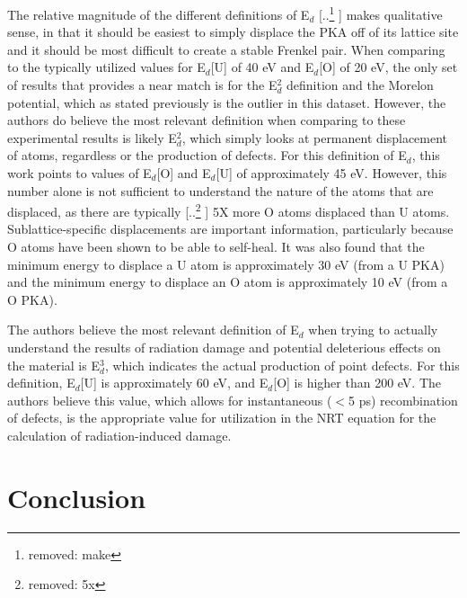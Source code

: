 \documentclass[review]{elsarticle}
\providecommand{\DIFaddtex}[1]{{\protect\color{blue} \sf #1}} %
\providecommand{\DIFdeltex}[1]{{\protect\color{red} [..\footnote{removed: #1} ]}} %
\providecommand{\DIFaddbegin}{} %
\providecommand{\DIFaddend}{} %
\providecommand{\DIFdelbegin}{} %
\providecommand{\DIFdelend}{} %
\providecommand{\DIFadd}[1]{\texorpdfstring{\DIFaddtex{#1}}{#1}} %
\providecommand{\DIFdel}[1]{\texorpdfstring{\DIFdeltex{#1}}{}} %
\newcommand{\DIFscaledelfig}{0.5}
\newlength{\DIFdelgraphicswidth} %
\newlength{\DIFdelgraphicsheight} %
\newcommand{\DIFaddincludegraphics}[2][]{{\color{blue}\fbox{\DIFOincludegraphics[#1]{#2}}}} %
\newcommand{\DIFdelincludegraphics}[2][]{%
\sbox{\DIFdelgraphicsbox}{\DIFOincludegraphics[#1]{#2}}%
\settoboxwidth{\DIFdelgraphicswidth}{\DIFdelgraphicsbox} %
\settoboxtotalheight{\DIFdelgraphicsheight}{\DIFdelgraphicsbox} %
\scalebox{\DIFscaledelfig}{%
\parbox[b]{\DIFdelgraphicswidth}{\usebox{\DIFdelgraphicsbox}\\[-\baselineskip] \rule{\DIFdelgraphicswidth}{0em}}\llap{\resizebox{\DIFdelgraphicswidth}{\DIFdelgraphicsheight}{%
\setlength{\unitlength}{\DIFdelgraphicswidth}%
\begin{picture}(1,1)%
\thicklines\linethickness{2pt} %
{\color[rgb]{1,0,0}\put(0,0){\framebox(1,1){}}}%
{\color[rgb]{1,0,0}\put(0,0){\line( 1,1){1}}}%
{\color[rgb]{1,0,0}\put(0,1){\line(1,-1){1}}}%
\end{picture}%
}\hspace*{3pt}}} %
} %
\DeclareRobustCommand{\DIFaddbegin}{\DIFOaddbegin \let\includegraphics\DIFaddincludegraphics} %
\DeclareRobustCommand{\DIFaddend}{\DIFOaddend \let\includegraphics\DIFOincludegraphics} %
\DeclareRobustCommand{\DIFdelbegin}{\DIFOdelbegin \let\includegraphics\DIFdelincludegraphics} %
\DeclareRobustCommand{\DIFdelend}{\DIFOaddend \let\includegraphics\DIFOincludegraphics} %
\begin{document}
The relative magnitude of the different definitions of E$_d$ \DIFdelbegin \DIFdel{make }\DIFdelend \DIFaddbegin \DIFadd{makes }\DIFaddend qualitative sense, in that it should be easiest to simply displace the PKA off of its lattice site and it should be most difficult to create a stable Frenkel pair. When comparing to the typically utilized values for E$_d$[U] of 40 eV and E$_d$[O] of 20 eV, the only set of results that provides a near match is for the E$_d^2$ definition and the Morelon potential, which as stated previously is the outlier in this dataset. However, the authors do believe the most relevant definition when comparing to these experimental results is likely E$_d^2$, which simply looks at permanent displacement of atoms, regardless or the production of defects. For this definition of E$_d$, this work points to values of E$_d$[O] and E$_d$[U] of approximately 45 eV. However, this number alone is not sufficient to understand the nature of the atoms that are displaced, as there are typically \DIFdelbegin \DIFdel{5x }\DIFdelend \DIFaddbegin \DIFadd{5X }\DIFaddend more O atoms displaced than U atoms. Sublattice-specific displacements are important information, particularly because O atoms have been shown to be able to self-heal. It was also found that the minimum energy to displace a U atom is approximately 30 eV (from a U PKA) and the minimum energy to displace an O atom is approximately 10 eV (from a O PKA).

The authors believe the most relevant definition of E$_d$ when trying to actually understand the results of radiation damage and potential deleterious effects on the material is E$_d^3$, which indicates the actual production of point defects. For this definition, E$_d$[U] is approximately 60 eV, and E$_d$[O] is higher than 200 eV. The authors believe this value, which allows for instantaneous ($<$5 ps) recombination of defects, is the appropriate value for utilization in the NRT equation for the calculation of radiation-induced damage.

\FloatBarrier

\section{Conclusion}
\hspace{5mm}
\end{document}
